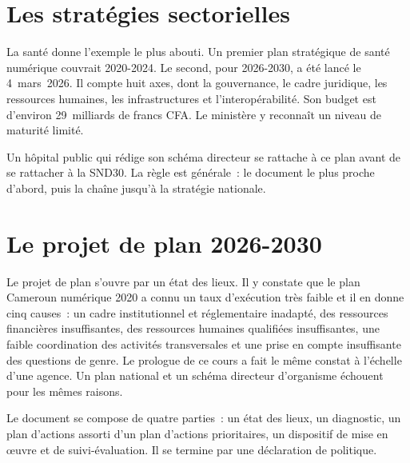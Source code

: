 \section{Les stratégies sectorielles}
\label{sec:c06-secteurs}

La santé donne l'exemple le plus abouti. Un premier plan stratégique de santé numérique couvrait 2020-2024. Le
second, pour 2026-2030, a été lancé le 4~mars~2026. Il compte huit axes, dont la gouvernance, le cadre
juridique, les ressources humaines, les infrastructures et l'interopérabilité. Son budget est d'environ
29~milliards de francs CFA. Le ministère y reconnaît un niveau de maturité limité.

Un hôpital public qui rédige son schéma directeur se rattache à ce plan avant de se rattacher à la SND30. La
règle est générale~: le document le plus proche d'abord, puis la chaîne jusqu'à la stratégie nationale.

\section{Le projet de plan 2026-2030}
\label{sec:c06-projet}

Le projet de plan s'ouvre par un état des lieux. Il y constate que le plan Cameroun numérique 2020 a connu un
taux d'exécution très faible et il en donne cinq causes~: un cadre institutionnel et réglementaire inadapté,
des ressources financières insuffisantes, des ressources humaines qualifiées insuffisantes, une faible
coordination des activités transversales et une prise en compte insuffisante des questions de genre. Le
prologue de ce cours a fait le même constat à l'échelle d'une agence. Un plan national et un schéma directeur
d'organisme échouent pour les mêmes raisons.

Le document se compose de quatre parties~: un état des lieux, un diagnostic, un plan d'actions assorti d'un
plan d'actions prioritaires, un dispositif de mise en œuvre et de suivi-évaluation. Il se termine par une
déclaration de politique.

